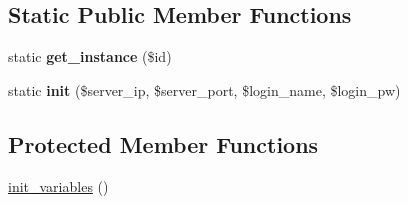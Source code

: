\subsection*{Static Public Member Functions}
\begin{DoxyCompactItemize}
\item 
\hypertarget{classsteam__connection_a6ff396484aadbadbf9aee2fe6c65334b}{
static {\bfseries get\_\-instance} (\$id)}
\label{classsteam__connection_a6ff396484aadbadbf9aee2fe6c65334b}

\item 
\hypertarget{classsteam__connection_a7c114abf74270d977464143e06cab52c}{
static {\bfseries init} (\$server\_\-ip, \$server\_\-port, \$login\_\-name, \$login\_\-pw)}
\label{classsteam__connection_a7c114abf74270d977464143e06cab52c}

\end{DoxyCompactItemize}
\subsection*{Protected Member Functions}
\begin{DoxyCompactItemize}
\item 
\hyperlink{classsteam__connection_ab33d74e636885f3a2a04459649e68c4d}{init\_\-variables} ()
\end{DoxyCompactItemize}
